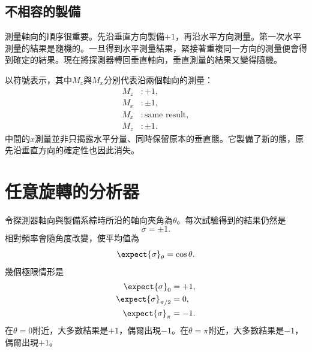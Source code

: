 \subsection{不相容的製備}

測量軸向的順序很重要。先沿垂直方向製備\(+1\)，再沿水平方向測量。第一次水平測量的結果是隨機的。一旦得到水平測量結果，緊接著重複同一方向的測量便會得到確定的結果。現在將探測器轉回垂直軸向，垂直測量的結果又變得隨機。

以符號表示，其中\(M_z\)與\(M_x\)分別代表沿兩個軸向的測量：
\begin{equation}
\begin{aligned}
  M_z&:+1,\\
  M_x&:\pm1,\\
  M_x&:\text{same result},\\
  M_z&:\pm1.
\end{aligned}
\end{equation}
中間的\(x\)測量並非只揭露水平分量、同時保留原本的垂直態。它製備了新的態，原先沿垂直方向的確定性也因此消失。

\begin{classroomqa}
\end{classroomqa}

\begin{classroomqa}
\end{classroomqa}

\section{任意旋轉的分析器}

令探測器軸向與製備系綜時所沿的軸向夾角為\(\theta\)。每次試驗得到的結果仍然是
\begin{equation}
  \sigma=\pm1.
\end{equation}
相對頻率會隨角度改變，使平均值為
\begin{equation}
  \expect{\sigma}_{\theta}=\cos\theta.
  \label{eq:qml1-cosine-mean}
\end{equation}
幾個極限情形是
\begin{align}
  \expect{\sigma}_{0}&=+1,\\
  \expect{\sigma}_{\pi/2}&=0,\\
  \expect{\sigma}_{\pi}&=-1.
\end{align}
在\(\theta=0\)附近，大多數結果是\(+1\)，偶爾出現\(-1\)。在\(\theta=\pi\)附近，大多數結果是\(-1\)，偶爾出現\(+1\)。

